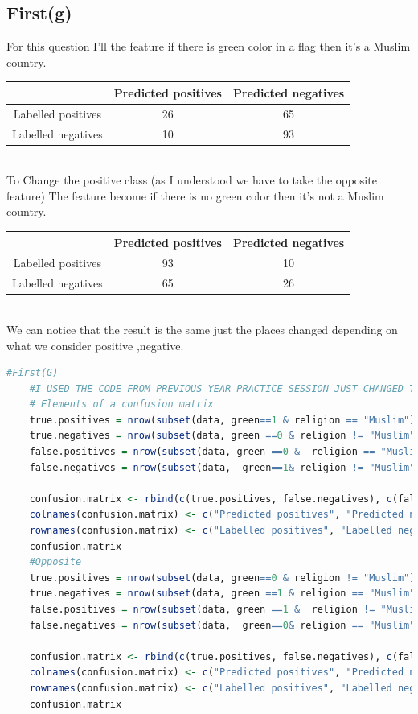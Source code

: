 \documentclass{article}
\begin{document}
	\subsection*{First(g)}
	For this question I'll the feature if there is green color in a flag then it's a Muslim country.\\
	\begin{tabular}{|c|c|c|}
		\hline
		&Predicted positives&Predicted negatives\\
		\hline
		Labelled positives&26&65\\
		\hline
		Labelled negatives&10&93\\
		\hline
	\end{tabular}\\
	To Change the positive class (as I understood we have to take the opposite feature) The feature become if there is no green color then it's not a Muslim country.\\
	\begin{tabular}{|c|c|c|}
		\hline
		&Predicted positives&Predicted negatives\\
		\hline
		Labelled positives&93&10\\
		\hline
		Labelled negatives&65&26\\
		\hline
	\end{tabular}\\
	We can notice that the result is the same just the places changed depending on what we consider positive ,negative.
	\begin{lstlisting}[language=R]
	#First(G)
	#I USED THE CODE FROM PREVIOUS YEAR PRACTICE SESSION JUST CHANGED THE PARAMETERS
	# Elements of a confusion matrix
	true.positives = nrow(subset(data, green==1 & religion == "Muslim"))
	true.negatives = nrow(subset(data, green ==0 & religion != "Muslim"))
	false.positives = nrow(subset(data, green ==0 &  religion == "Muslim"))
	false.negatives = nrow(subset(data,  green==1& religion != "Muslim"))
	
	confusion.matrix <- rbind(c(true.positives, false.negatives), c(false.positives, true.negatives))
	colnames(confusion.matrix) <- c("Predicted positives", "Predicted negatives")
	rownames(confusion.matrix) <- c("Labelled positives", "Labelled negatives")
	confusion.matrix
	#Opposite
	true.positives = nrow(subset(data, green==0 & religion != "Muslim"))
	true.negatives = nrow(subset(data, green ==1 & religion == "Muslim"))
	false.positives = nrow(subset(data, green ==1 &  religion != "Muslim"))
	false.negatives = nrow(subset(data,  green==0& religion == "Muslim"))
	
	confusion.matrix <- rbind(c(true.positives, false.negatives), c(false.positives, true.negatives))
	colnames(confusion.matrix) <- c("Predicted positives", "Predicted negatives")
	rownames(confusion.matrix) <- c("Labelled positives", "Labelled negatives")
	confusion.matrix
	\end{lstlisting}
\end{document}

